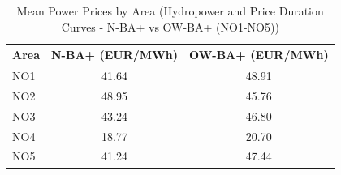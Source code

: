 \begin{table}[htbp]
\centering
\caption{Mean Power Prices by Area (Hydropower and Price Duration Curves - N-BA+ vs OW-BA+ (NO1-NO5))}
\label{tab:mean_prices_NO_areas_N_OW_uprate}
\begin{tabular}{lcc}
\hline
Area & N-BA+ (EUR/MWh) & OW-BA+ (EUR/MWh) \\
\hline
NO1 & 41.64 & 48.91 \\
NO2 & 48.95 & 45.76 \\
NO3 & 43.24 & 46.80 \\
NO4 & 18.77 & 20.70 \\
NO5 & 41.24 & 47.44 \\
\hline
\end{tabular}
\end{table}